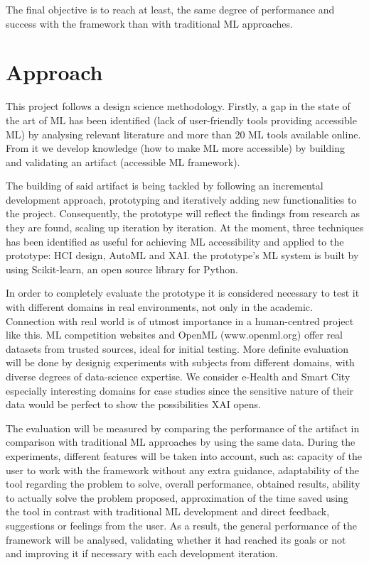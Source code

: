 \documentclass[runningheads]{llncs}
\begin{document}
The final objective is to reach at least, the same degree of performance and success with the framework than with traditional ML approaches.

\section{Approach}

This project follows a design science methodology. Firstly, a gap in the state of the art of ML has been identified (lack of user-friendly tools providing accessible ML) by analysing relevant literature and more than 20 ML tools available online. From it we develop knowledge (how to make ML more accessible) by building and validating an artifact (accessible ML framework).

The building of said artifact is being tackled by following an incremental development approach, prototyping and iteratively adding new functionalities to the project. Consequently, the prototype will reflect the findings from research as they are found, scaling up iteration by iteration. At the moment, three techniques has been identified as useful for achieving ML accessibility and applied to the prototype: HCI design, AutoML and XAI. the prototype's ML system is built by using Scikit-learn, an open source library for Python.

In order to completely evaluate the prototype it is considered necessary to test it with different domains in real environments, not only in the academic. Connection with real world is of utmost importance in a human-centred project like this. ML competition websites and OpenML (www.openml.org) offer real datasets from trusted sources, ideal for initial testing. More definite evaluation will be done by designig experiments with subjects from different domains, with diverse degrees of data-science expertise. We consider e-Health and Smart City especially interesting domains for case studies since the sensitive nature of their data would be perfect to show the possibilities XAI opens.

The evaluation will be measured by comparing the performance of the artifact in comparison with traditional ML approaches by using the same data.  During the experiments, different features will be taken into account, such as: capacity of the user to work with the framework without any extra guidance, adaptability of the tool regarding the problem to solve, overall performance, obtained results, ability to actually solve the problem proposed, approximation of the time saved using the tool in contrast with traditional ML development and direct feedback, suggestions or feelings from the user. As a result, the general performance of the framework will be analysed, validating whether it had reached its goals or not and improving it if necessary with each development iteration.
\end{document}
